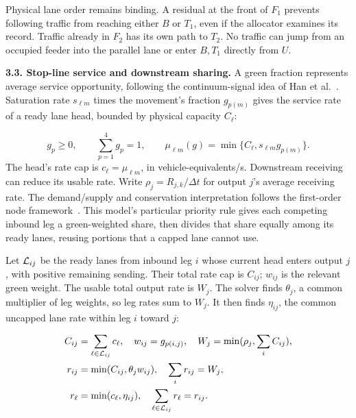 \documentclass[10pt,a4paper]{article}
\newenvironment{revision}{\begingroup\color{revisionred}}{\par\endgroup}
\begin{document}
Physical lane order remains binding. A residual at the front of $F_1$
prevents following traffic from reaching either $B$ or $T_1$, even if
the allocator examines its record. Traffic already in $F_2$ has its own
path to $T_2$. No traffic can jump from an occupied feeder into the
parallel lane or enter $B,T_1$ directly from $U$.

\begin{revision}
\textbf{3.3. Stop-line service and downstream sharing.}
A green fraction represents average service opportunity, following the
continuum-signal idea of Han et al.~\cite{han}. Saturation rate
$s_{\ell m}$ times the movement's fraction $g_{p(m)}$ gives the service
rate of a ready lane head, bounded by physical capacity $C_\ell$:
\end{revision}
\begin{equation}
 g_p\geq0,\qquad \sum_{p=1}^4g_p=1,\qquad
 \mu_{\ell m}(g)=\min\{C_\ell,s_{\ell m}g_{p(m)}\}.
 \label{eq:compact-action}
\end{equation}
\begin{revision}
The head's rate cap is $c_\ell=\mu_{\ell m}$, in vehicle-equivalents/s.
Downstream receiving can reduce its usable rate. Write
$\rho_j=R_{j,k}/\Delta t$ for output $j$'s average receiving rate.
The demand/supply and conservation interpretation follows the first-order
node framework~\cite{node}. This model's particular priority rule gives
each competing inbound leg a green-weighted share, then divides that
share equally among its ready lanes, reusing portions that a capped lane
cannot use.

Let ${\cal L}_{ij}$ be the ready lanes from inbound leg $i$ whose current
head enters output $j$, with positive remaining sending. Their total rate
cap is $C_{ij}$; $w_{ij}$ is the relevant green weight. The usable total
output rate is $W_j$. The solver finds $\theta_j$, a common multiplier of
leg weights, so leg rates sum to $W_j$. It then finds $\eta_{ij}$, the
common uncapped lane rate within leg $i$ toward $j$:
\end{revision}
\begin{align}
 C_{ij}&=\sum_{\ell\in{\cal L}_{ij}}c_\ell,\quad
 w_{ij}=g_{p(i,j)},\quad W_j=\min(\rho_j,\sum_iC_{ij}),\nonumber\\
 r_{ij}&=\min(C_{ij},\theta_jw_{ij}),\quad
                    \sum_i r_{ij}=W_j,\label{eq:compact-leg-sharing}\\
 r_\ell&=\min(c_\ell,\eta_{ij}),\quad
                    \sum_{\ell\in{\cal L}_{ij}}r_\ell=r_{ij}.
 \label{eq:compact-lane-sharing}
\end{align}
\end{document}
